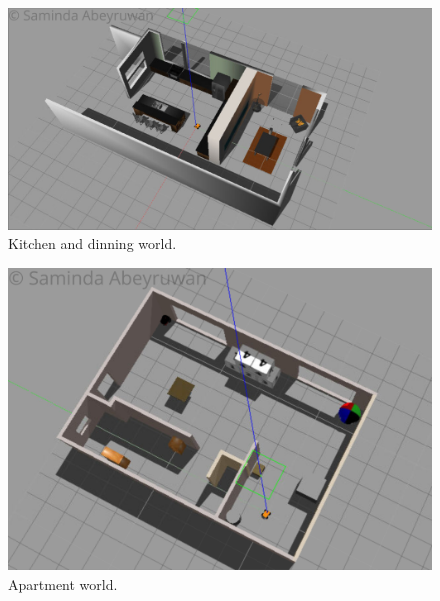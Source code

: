 \documentclass[10pt,journal,compsoc]{IEEEtran}
\begin{document}
\begin{figure}[thpb]
      \centering
      \includegraphics[width=\linewidth]{kad_w}
      \caption{Kitchen and dinning world.}
      \label{fig:kad}
\end{figure}

\begin{figure}[thpb]
      \centering
      \includegraphics[width=\linewidth]{apt_w}
      \caption{Apartment world.}
      \label{fig:apt}
\end{figure}

\end{document}
